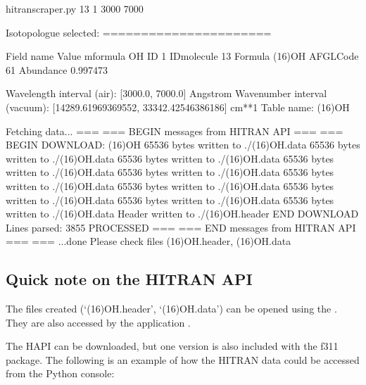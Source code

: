 \documentclass[letterpaper,10pt,english]{sphinxmanual}
\begin{document}
\begin{sphinxVerbatim}[commandchars=\\\{\}]
\PYGZdl{} hitran\PYGZhy{}scraper.py 13 1 3000 7000

Isotopologue selected:
======================

Field name    Value
\PYGZhy{}\PYGZhy{}\PYGZhy{}\PYGZhy{}\PYGZhy{}\PYGZhy{}\PYGZhy{}\PYGZhy{}\PYGZhy{}\PYGZhy{}\PYGZhy{}\PYGZhy{}  \PYGZhy{}\PYGZhy{}\PYGZhy{}\PYGZhy{}\PYGZhy{}\PYGZhy{}\PYGZhy{}\PYGZhy{}
m\PYGZus{}formula     OH
ID            1
ID\PYGZus{}molecule   13
Formula       (16)OH
AFGL\PYGZus{}Code     61
Abundance     0.997473

Wavelength interval (air): [3000.0, 7000.0] Angstrom
Wavenumber interval (vacuum): [14289.61969369552, 33342.42546386186] cm**\PYGZhy{}1
Table name: \PYGZsq{}(16)OH\PYGZsq{}

Fetching data...
===
=== BEGIN messages from HITRAN API ===
===
BEGIN DOWNLOAD: (16)OH
  65536 bytes written to ./(16)OH.data
  65536 bytes written to ./(16)OH.data
  65536 bytes written to ./(16)OH.data
  65536 bytes written to ./(16)OH.data
  65536 bytes written to ./(16)OH.data
  65536 bytes written to ./(16)OH.data
  65536 bytes written to ./(16)OH.data
  65536 bytes written to ./(16)OH.data
  65536 bytes written to ./(16)OH.data
  65536 bytes written to ./(16)OH.data
Header written to ./(16)OH.header
END DOWNLOAD
                     Lines parsed: 3855
PROCESSED
===
=== END messages from HITRAN API ===
===
...done
Please check files \PYGZsq{}(16)OH.header\PYGZsq{}, \PYGZsq{}(16)OH.data\PYGZsq{}
\end{sphinxVerbatim}


\subsection{Quick note on the HITRAN API}
\label{\detokenize{autoscripts/script-hitran-scraper:quick-note-on-the-hitran-api}}
The files created (‘(16)OH.header’, ‘(16)OH.data’) can be opened using the .
They are also accessed by the application .

The HAPI can be downloaded, but one version is also included with the f311 package. The following
is an example of how the HITRAN data could be accessed from the Python console:
\end{document}
